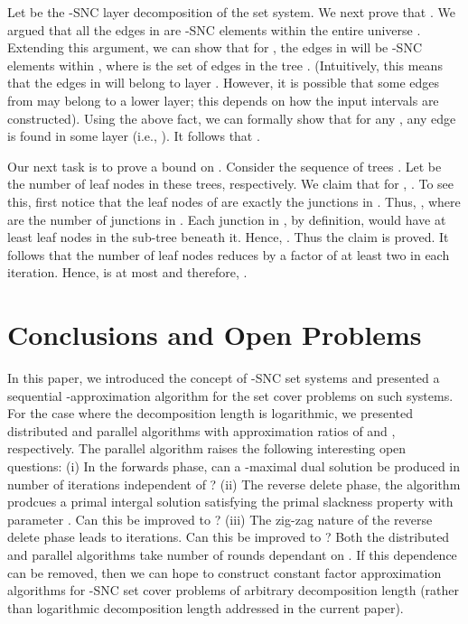 \documentclass[11pt]{article}
\begin{document}
Let  be the -SNC layer decomposition of the set system.
We next prove that . We argued that all the edges in  are -SNC elements 
within the entire universe .
Extending this argument, we can show that for , the edges in  will be -SNC elements within ,
where  is the set of edges in the tree .
(Intuitively, this means that the edges in  will belong to layer . 
However, it is possible that some edges from  may belong to a lower layer;
this depends on how the input intervals are constructed). 
Using the above fact, we can formally show that for any ,
any edge  is found in some layer  (i.e., ).
It follows that .

Our next task is to prove a bound on .
Consider the sequence of trees .
Let  be the number of leaf nodes in these trees, respectively.
We claim that for , .
To see this, first notice that the leaf nodes of  are exactly the junctions in .
Thus, , where  are the number of junctions in .
Each junction in , by definition, would have at least  leaf nodes in the sub-tree beneath it.
Hence, . Thus the claim is proved. It follows that the number of leaf nodes
reduces by a factor of at least two in each iteration. Hence,  is at most 
and therefore, .

\section{Conclusions and Open Problems}
In this paper, we introduced the concept of -SNC set systems
and presented a sequential -approximation algorithm for the set cover problems on such systems.
For the case where the decomposition length is logarithmic, we presented distributed 
and parallel algorithms with approximation ratios of  and , respectively.
The parallel algorithm raises the following interesting open questions:
(i) In the forwards phase, can a -maximal dual solution
be produced in number of iterations independent of ? 
(ii) The reverse delete phase, the algorithm prodcues a primal intergal solution satisfying the primal slackness property
with parameter . Can this be improved to ? (iii) The zig-zag nature of the reverse delete phase
leads to  iterations. Can this be improved to ?
Both the distributed and parallel algorithms take number of rounds dependant on .
If this dependence can be removed, then we can hope to construct constant factor approximation
algorithms for -SNC set cover problems of arbitrary decomposition length (rather than logarithmic decomposition length 
addressed in the current paper). 




\end{document}
